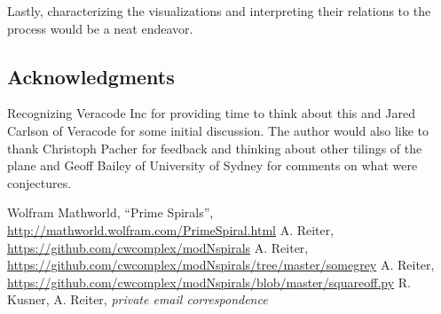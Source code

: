 \documentclass[11pt]{amsart}
\theoremstyle{mydef}
\begin{document}
Lastly, characterizing the visualizations and interpreting their relations to the process would be a neat endeavor. 

\subsection{Acknowledgments}
Recognizing Veracode Inc for providing time to think about this and Jared Carlson of Veracode for some initial discussion. The author would also like to thank Christoph Pacher for feedback and thinking about other tilings of the plane and Geoff Bailey of University of Sydney for comments on what were conjectures.

\begin{thebibliography}{1}
 Wolfram Mathworld, ``Prime Spirals'', \url{http://mathworld.wolfram.com/PrimeSpiral.html}
 A. Reiter, \url{https://github.com/cwcomplex/modNspirals}
 A. Reiter, \url{https://github.com/cwcomplex/modNspirals/tree/master/somegrey}
 A. Reiter, \url{https://github.com/cwcomplex/modNspirals/blob/master/squareoff.py}
 R. Kusner, A. Reiter, \textit{private email correspondence}

\end{thebibliography}
\end{document}
